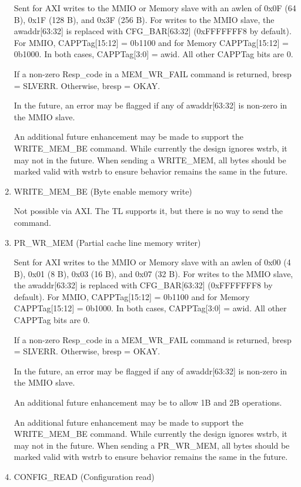 \begin{enumerate}
  Sent for AXI writes to the MMIO or Memory slave with an awlen of
  0x0F (64 B), 0x1F (128 B), and 0x3F (256 B). For writes to the MMIO
  slave, the awaddr[63:32] is replaced with CFG\_BAR[63:32]
  (0xFFFFFFF8 by default). For MMIO, CAPPTag[15:12] = 0b1100 and for
  Memory CAPPTag[15:12] = 0b1000. In both cases, CAPPTag[3:0] =
  awid. All other CAPPTag bits are 0.

  If a non-zero Resp\_code in a MEM\_WR\_FAIL command is returned,
  bresp = SLVERR. Otherwise, bresp = OKAY.

  In the future, an error may be flagged if any of awaddr[63:32] is
  non-zero in the MMIO slave.

  An additional future enhancement may be made to support the
  WRITE\_MEM\_BE command. While currently the design ignores wstrb, it
  may not in the future. When sending a WRITE\_MEM, all bytes should
  be marked valid with wstrb to ensure behavior remains the same in
  the future.

\item{WRITE\_MEM\_BE (Byte enable memory write)}

  Not possible via AXI. The TL supports it, but there is no way to
  send the command.

\item{PR\_WR\_MEM (Partial cache line memory writer)}

  Sent for AXI writes to the MMIO or Memory slave with an awlen of
  0x00 (4 B), 0x01 (8 B), 0x03 (16 B), and 0x07 (32 B). For writes to
  the MMIO slave, the awaddr[63:32] is replaced with CFG\_BAR[63:32]
  (0xFFFFFFF8 by default). For MMIO, CAPPTag[15:12] = 0b1100 and for
  Memory CAPPTag[15:12] = 0b1000. In both cases, CAPPTag[3:0] =
  awid. All other CAPPTag bits are 0.

  If a non-zero Resp\_code in a MEM\_WR\_FAIL command is returned,
  bresp = SLVERR. Otherwise, bresp = OKAY.

  In the future, an error may be flagged if any of awaddr[63:32] is
  non-zero in the MMIO slave.

  An additional future enhancement may be to allow 1B and 2B
  operations.

  An additional future enhancement may be made to support the
  WRITE\_MEM\_BE command. While currently the design ignores wstrb, it
  may not in the future. When sending a PR\_WR\_MEM, all bytes should
  be marked valid with wstrb to ensure behavior remains the same in
  the future.

\item{CONFIG\_READ (Configuration read)}


\end{enumerate}
